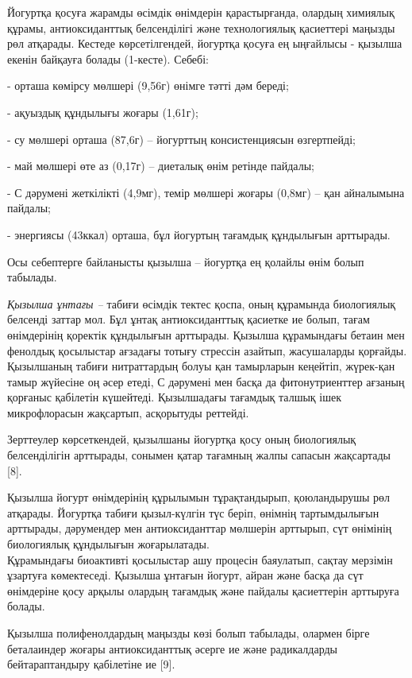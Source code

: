 \begin{multicols}{2}
Йогуртқа қосуға жарамды өсімдік өнімдерін қарастырғанда, олардың
химиялық құрамы, антиоксиданттық белсенділігі және технологиялық
қасиеттері маңызды рөл атқарады. Кестеде көрсетілгендей, йогуртқа қосуға
ең ыңғайлысы - қызылша екенін байқауға болады (1-кесте). Себебі:

- орташа көмірсу мөлшері (9,56г) өнімге тәтті дәм береді;

- ақуыздық құндылығы жоғары (1,61г);

- су мөлшері орташа (87,6г) -- йогурттың консистенциясын өзгертпейді;

- май мөлшері өте аз (0,17г) -- диеталық өнім ретінде пайдалы;

- С дәрумені жеткілікті (4,9мг), темір мөлшері жоғары (0,8мг) -- қан
айналымына пайдалы;

- энергиясы (43ккал) орташа, бұл йогуртың тағамдық құндылығын арттырады.

Осы себептерге байланысты қызылша -- йогуртқа ең қолайлы өнім болып
табылады.

\emph{Қызылша ұнтағы --} табиғи өсімдік тектес қоспа, оның құрамында
биологиялық белсенді заттар мол. Бұл ұнтақ антиоксиданттық қасиетке ие
болып, тағам өнімдерінің қоректік құндылығын арттырады. Қызылша
құрамындағы бетаин мен фенолдық қосылыстар ағзадағы тотығу стрессін
азайтып, жасушаларды қорғайды. Қызылшаның табиғи нитраттардың болуы қан
тамырларын кеңейтіп, жүрек-қан тамыр жүйесіне оң әсер етеді, С дәрумені
мен басқа да фитонутриенттер ағзаның қорғаныс қабілетін күшейтеді.
Қызылшадағы тағамдық талшық ішек микрофлорасын жақсартып, асқорытуды
реттейді.

Зерттеулер көрсеткендей, қызылшаны йогуртқа қосу оның биологиялық
белсенділігін арттырады, сонымен қатар тағамның жалпы сапасын
жақсартады\hspace{0pt} {[}8{]}.

Қызылша йогурт өнімдерінің құрылымын тұрақтандырып, қоюландырушы рөл
атқарады. Йогуртқа табиғи қызыл-күлгін түс беріп, өнімнің тартымдылығын
арттырады, дәрумендер мен антиоксиданттар мөлшерін арттырып, сүт
өнімінің биологиялық құндылығын жоғарылатады.\\
Құрамындағы биоактивті қосылыстар ашу процесін баяулатып, сақтау
мерзімін ұзартуға көмектеседі. Қызылша ұнтағын йогурт, айран және басқа
да сүт өнімдеріне қосу арқылы олардың тағамдық және пайдалы қасиеттерін
арттыруға болады.

Қызылша полифенолдардың маңызды көзі болып табылады, олармен бірге
беталаиндер жоғары антиоксиданттық әсерге ие және радикалдарды
бейтараптандыру қабілетіне ие {[}9{]}.


\end{multicols}
